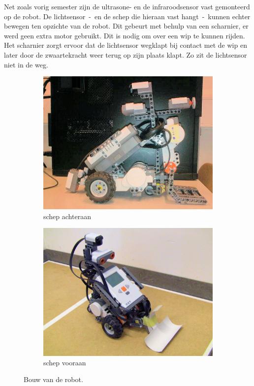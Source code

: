 \documentclass[tt1]{penoverslag}
\begin{document}
Net zoals vorig semester zijn de ultrasone- en de infraroodsensor vast gemonteerd op de robot. De lichtsensor~-~en de schep die hieraan vast hangt~-~kunnen echter bewegen ten opzichte van de robot. Dit gebeurt met behulp van een scharnier, er werd geen extra motor gebruikt. Dit is nodig om over een wip te kunnen rijden. Het scharnier zorgt ervoor dat de lichtsensor wegklapt bij contact met de wip en later door de zwaartekracht weer terug op zijn plaats klapt. Zo zit de lichtsensor niet in de weg.

\begin{figure}
\centering
	\begin{subfigure}[h]{0.45\textwidth}
	\centering
		\includegraphics[width=\textwidth]{robotSchepOud}
		\caption{schep achteraan}
	\end{subfigure}%
	\begin{subfigure}[h]{0.47\textwidth}
		\centering
		\includegraphics[width=\textwidth]{robotSchepNieuw}
	\caption{schep vooraan}
\end{subfigure}
\caption{Bouw van de robot.}
\label{fig:robotBouw}
\end{figure}
\end{document}
